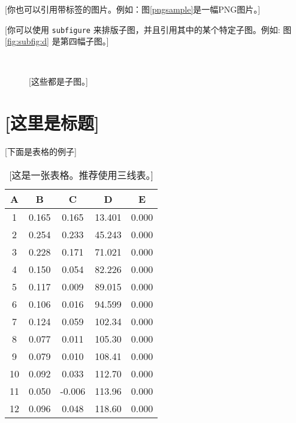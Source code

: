 \documentclass[a4paper,11pt,onecolumn,twoside]{article}
\begin{document}
[你也可以引用带标签的图片。例如：图\ref{pngsample}是一幅PNG图片。]

[你可以使用 \texttt{subfigure} 来排版子图，并且引用其中的某个特定子图。例如: 图 \ref{fig:subfig:d} 是第四幅子图。]
  \begin{figure}[htbp]
    \centering
    \hspace{1in}
    \hspace{1in} \\
    \hspace{1in}
    \caption{[这些都是子图。]}
    \label{fig:subfig}
  \end{figure}

\section{[这里是标题]}
[下面是表格的例子]
\begin{table}[htbp]
  \centering
  \begin{tabular}{ccccc}
    \midrule[1.5pt]
    A & B & C & D & E \\
    \hline
    1 & 0.165 & 0.165 & 13.401 & 0.000 \\
    2 & 0.254 & 0.233 & 45.243 & 0.000 \\
    3 & 0.228 & 0.171 & 71.021 & 0.000 \\
    4 & 0.150 & 0.054 & 82.226 & 0.000 \\
    5 & 0.117 & 0.009 & 89.015 & 0.000 \\
    6 & 0.106 & 0.016 & 94.599 & 0.000 \\
    7 & 0.124 & 0.059 & 102.34 & 0.000 \\
    8 & 0.077 & 0.011 & 105.30 & 0.000 \\
    9 & 0.079 & 0.010 & 108.41 & 0.000 \\
    10 & 0.092 & 0.033 & 112.70 & 0.000 \\
    11 & 0.050 & -0.006 & 113.96 & 0.000 \\
    12 & 0.096 & 0.048 & 118.60 & 0.000 \\
    \midrule[1.5pt]
  \end{tabular}
  \caption{[这是一张表格。推荐使用三线表。]}
\end{table}
\end{document}
